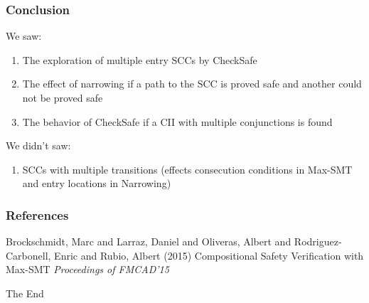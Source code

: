 \documentclass{beamer}
\begin{document}
\begin{frame}
  \frametitle{Conclusion}
  \begin{block}{We saw:}
    \begin{enumerate}
    \item The exploration of multiple entry SCCs by CheckSafe
    \item The effect of narrowing if a path to the SCC is proved safe and another could not be proved safe
    \item The behavior of CheckSafe if a CII with multiple conjunctions is found
    \end{enumerate}
  \end{block}
  \begin{block}{We didn't saw:}
    \begin{enumerate}
    \item SCCs with multiple transitions (effects consecution conditions in Max-SMT and entry locations in Narrowing)
    \end{enumerate}
  \end{block}
\end{frame}

\begin{frame}
\frametitle{References}
\footnotesize{
\begin{thebibliography}{99} %
 Brockschmidt, Marc and Larraz, Daniel and Oliveras, Albert and Rodriguez-Carbonell, Enric and Rubio, Albert (2015)
\newblock Compositional Safety Verification with Max-SMT
\newblock \emph{Proceedings of FMCAD'15}
\end{thebibliography}
}
\end{frame}


\begin{frame}
\Huge{\centerline{The End}}
\end{frame}

\end{document}
